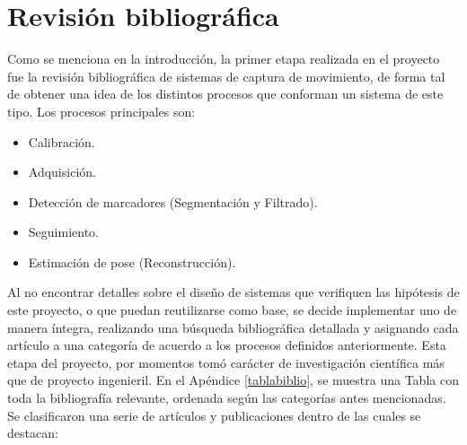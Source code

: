 \chapter{Revisión bibliográfica}
\label{invBiblio}

Como se menciona en la introducción, la primer etapa realizada en el proyecto fue la revisión bibliográfica de sistemas de captura de movimiento, de forma tal de obtener una idea de los distintos procesos que conforman un sistema de este tipo. Los procesos principales son:

\begin{itemize}
	\item Calibración.
	\item Adquisición.
	\item Detección de marcadores (Segmentación y Filtrado).
	\item Seguimiento.
	\item Estimación de pose (Reconstrucción).
\end{itemize}

Al no encontrar detalles sobre el diseño de sistemas que verifiquen las hipótesis de este proyecto, o que puedan reutilizarse como base, se decide implementar uno de manera íntegra, realizando una búsqueda bibliográfica detallada y asignando cada artículo a una categoría de acuerdo a los procesos definidos anteriormente. Esta etapa del proyecto, por momentos tomó carácter de investigación científica más que de proyecto ingenieril. 
En el Apéndice \ref{tablabiblio}, se muestra una Tabla con toda la bibliografía relevante, ordenada según las categorías antes mencionadas.
\\ 

Se clasificaron una serie de artículos y publicaciones dentro de las cuales se destacan:

